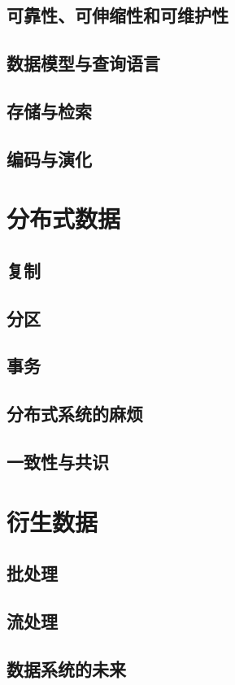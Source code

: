 \documentclass{book}
\begin{document}
\chapter{可靠性、可伸缩性和可维护性}
\label{ch:ch1}


\chapter{数据模型与查询语言}
\label{ch:ch2}


\chapter{存储与检索}
\label{ch:ch3}

\chapter{编码与演化}
\label{ch:ch4}

\part{分布式数据}
\label{part:part-2}

\chapter{复制}
\label{ch:ch5}

\chapter{分区}
\label{ch:ch6}

\chapter{事务}
\label{ch:ch7}

\chapter{分布式系统的麻烦}
\label{ch:ch8}

\chapter{一致性与共识}
\label{ch:ch9}

\part{衍生数据}
\label{part:part-3}

\chapter{批处理}
\label{ch:ch10}

\chapter{流处理}
\label{ch:ch11}

\chapter{数据系统的未来}
\label{ch:ch12}
\end{document}
